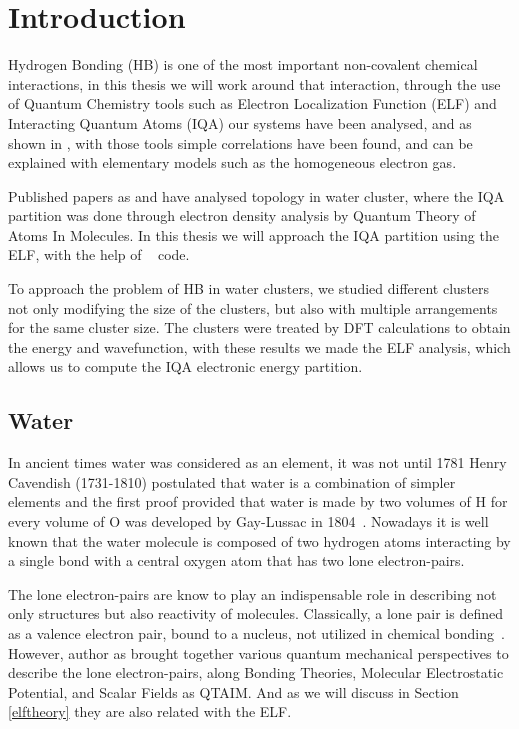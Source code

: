 \chapter{Introduction}

Hydrogen Bonding (HB) is one of the most important non-covalent chemical
interactions, in this thesis we will work around that interaction, through the
use of Quantum Chemistry tools such as Electron Localization Function (ELF) and
Interacting Quantum Atoms (IQA) our systems have been analysed, and as shown in
\citet{Munrriz2019}, with those tools simple correlations have been found, and
can be explained with elementary models such as the homogeneous electron gas.

Published papers as \citet{Toche2016} and \citet{Castor2020} have analysed
topology in water cluster, where the IQA partition was done through electron
density analysis by Quantum Theory of Atoms In Molecules. In this thesis we
will approach the IQA partition using the ELF, with the help of
{}~\cite{promolden} code.

To approach the problem of HB in water clusters, we studied different clusters
not only modifying the size of the clusters, but also with multiple
arrangements for the same cluster size. The clusters were treated by DFT
calculations to obtain the energy and wavefunction, with these results we made
the ELF analysis, which allows us to compute the IQA electronic energy
partition.

\newpage
%
\section{Water}

In ancient times water was considered as an element, it was not until 1781
Henry Cavendish (1731-1810) postulated that water is a combination of simpler
elements and the first proof provided that water is made by two volumes of H
for every volume of O was developed by Gay-Lussac in
1804~\cite{sanchez2006revolucion}.  Nowadays it is well known that the
water molecule is composed of two hydrogen atoms interacting by a
single bond with a central oxygen atom that has two lone
electron-pairs.

The lone electron-pairs are know to play an indispensable role in describing
not only structures but also reactivity of molecules. Classically, a lone pair
is defined as a valence electron pair, bound to a nucleus, not utilized in
chemical bonding~\cite{Lee1996-hp}. However, author as \citet{Kumar2014}
brought together various quantum mechanical perspectives to describe the lone
electron-pairs, along Bonding Theories, Molecular Electrostatic Potential, and
Scalar Fields as QTAIM. And as we will discuss in Section \ref{elftheory} they
are also related with the ELF.

